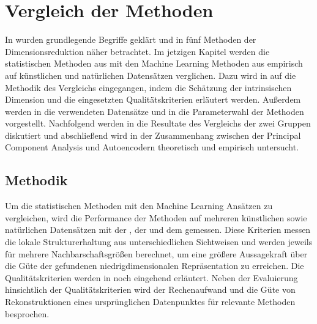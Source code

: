 \chapter{Vergleich der Methoden}
\label{ch:Vergleich}

In  wurden grundlegende Begriffe geklärt und in
 fünf Methoden der Dimensionsreduktion näher betrachtet. Im jetzigen
Kapitel werden die statistischen Methoden aus  mit den
Machine Learning Methoden aus  empirisch auf künstlichen und
natürlichen Datensätzen verglichen. Dazu wird in  auf die
Methodik des Vergleichs eingegangen, indem die Schätzung der intrinsischen Dimension und die
eingesetzten Qualitätskriterien erläutert werden. Außerdem werden in
 die verwendeten Datensätze und in
 die Parameterwahl der Methoden vorgestellt.
Nachfolgend werden in  die Resultate des Vergleichs der zwei
Gruppen diskutiert und abschließend wird in  der
Zusammenhang zwischen der Principal Component Analysis und Autoencodern theoretisch und empirisch
untersucht.

\section{Methodik}
\label{ch:Vergleich:sec:Methodik}

Um die statistischen Methoden mit den Machine Learning Ansätzen zu vergleichen, wird die
Performance der Methoden auf mehreren künstlichen sowie natürlichen Datensätzen mit der
, der  und dem  gemessen. Diese Kriterien messen die lokale Strukturerhaltung aus unterschiedlichen
Sichtweisen und werden jeweils für mehrere Nachbarschaftsgrößen berechnet, um eine größere
Aussagekraft über die Güte der gefundenen niedrigdimensionalen Repräsentation zu erreichen. Die
Qualitätskriterien werden in  noch
eingehend erläutert. Neben der Evaluierung hinsichtlich der Qualitätskriterien wird der
Rechenaufwand und die Güte von Rekonstruktionen eines ursprünglichen Datenpunktes für relevante
Methoden besprochen.

